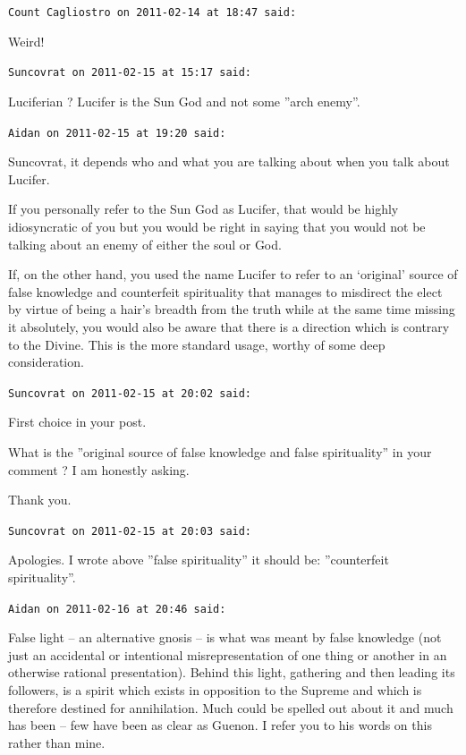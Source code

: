 \begin{footnotesize}
\begin{sffamily}
\texttt{Count Cagliostro on 2011-02-14 at 18:47 said:}

Weird!

\hfill

\texttt{Suncovrat on 2011-02-15 at 15:17 said:}

Luciferian ? Lucifer is the Sun God and not some ''arch enemy''.

\hfill

\texttt{Aidan on 2011-02-15 at 19:20 said:}

Suncovrat, it depends who and what you are talking about when you talk about Lucifer.

If you personally refer to the Sun God as Lucifer, that would be highly idiosyncratic of you but you would be right in saying that you would not be talking about an enemy of either the soul or God.

If, on the other hand, you used the name Lucifer to refer to an `original' source of false knowledge and counterfeit spirituality that manages to misdirect the elect by virtue of being a hair's breadth from the truth while at the same time missing it absolutely, you would also be aware that there is a direction which is contrary to the Divine. This is the more standard usage, worthy of some deep consideration.

\hfill

\texttt{Suncovrat on 2011-02-15 at 20:02 said:}

First choice in your post.

What is the ''original source of false knowledge and false spirituality'' in your comment ? I am honestly asking.

Thank you.

\hfill

\texttt{Suncovrat on 2011-02-15 at 20:03 said:}

Apologies. I wrote above ''false spirituality'' it should be: ''counterfeit spirituality''.

\hfill

\texttt{Aidan on 2011-02-16 at 20:46 said:}

False light -- an alternative gnosis -- is what was meant by false knowledge (not just an accidental or intentional misrepresentation of one thing or another in an otherwise rational presentation). Behind this light, gathering and then leading its followers, is a spirit which exists in opposition to the Supreme and which is therefore destined for annihilation. Much could be spelled out about it and much has been -- few have been as clear as Guenon. I refer you to his words on this rather than mine.


\end{sffamily}
\end{footnotesize}
